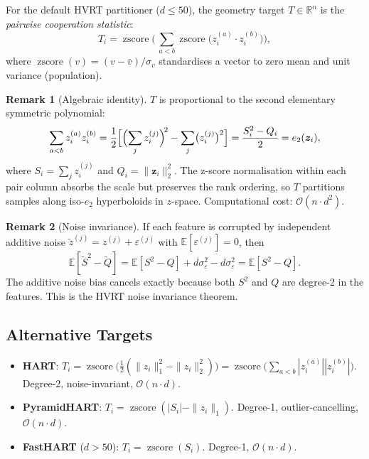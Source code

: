 \documentclass[11pt,a4paper]{article}
\newcommand{\R}{\mathbb{R}}
\newcommand{\E}{\mathbb{E}}
\newcommand{\zscore}{\operatorname{zscore}}
\theoremstyle{definition}
\newtheorem{remark}{Remark}
\begin{document}
For the default HVRT partitioner ($d \le 50$), the geometry target $T \in \R^n$
is the \emph{pairwise cooperation statistic}:
\begin{equation}
    T_i = \zscore\!\Biggl(\,\sum_{a < b} \zscore\bigl(z_i^{(a)} \cdot z_i^{(b)}\bigr)\Biggr),
\end{equation}
where $\zscore(v) = (v - \bar{v}) / \sigma_v$ standardises a vector to zero mean
and unit variance (population).

\begin{remark}[Algebraic identity]
$T$ is proportional to the second elementary symmetric polynomial:
\[
    \sum_{a < b} z_i^{(a)} z_i^{(b)}
    = \frac{1}{2}\Bigl[\Bigl(\sum_j z_i^{(j)}\Bigr)^{\!2} - \sum_j \bigl(z_i^{(j)}\bigr)^2\Bigr]
    = \frac{S_i^2 - Q_i}{2}
    = e_2(\bm{z}_i),
\]
where $S_i = \sum_j z_i^{(j)}$ and $Q_i = \|\bm{z}_i\|_2^2$.  The z-score
normalisation within each pair column absorbs the scale but preserves the
rank ordering, so $T$ partitions samples along iso-$e_2$ hyperboloids
in $z$-space.  Computational cost: $\mathcal{O}(n \cdot d^2)$.
\end{remark}

\begin{remark}[Noise invariance]
If each feature is corrupted by independent additive noise
$\tilde{z}^{(j)} = z^{(j)} + \varepsilon^{(j)}$ with
$\E[\varepsilon^{(j)}] = 0$, then
\[
    \E[\tilde{S}^2 - \tilde{Q}]
    = \E[S^2 - Q] + d\sigma_\varepsilon^2 - d\sigma_\varepsilon^2
    = \E[S^2 - Q].
\]
The additive noise bias cancels exactly because both $S^2$ and $Q$ are
degree-2 in the features.  This is the HVRT noise invariance theorem.
\end{remark}

\subsection{Alternative Targets}

\begin{itemize}[nosep]
    \item \textbf{HART}: $T_i = \zscore\!\bigl(\frac{1}{2}(\|z_i\|_1^2 - \|z_i\|_2^2)\bigr) = \zscore\!\bigl(\sum_{a<b}|z_i^{(a)}||z_i^{(b)}|\bigr)$.
        Degree-2, noise-invariant, $\mathcal{O}(n \cdot d)$.
    \item \textbf{PyramidHART}: $T_i = \zscore(|S_i| - \|z_i\|_1)$.
        Degree-1, outlier-cancelling, $\mathcal{O}(n \cdot d)$.
    \item \textbf{FastHART} ($d > 50$): $T_i = \zscore(S_i)$.
        Degree-1, $\mathcal{O}(n \cdot d)$.
\end{itemize}
\end{document}
